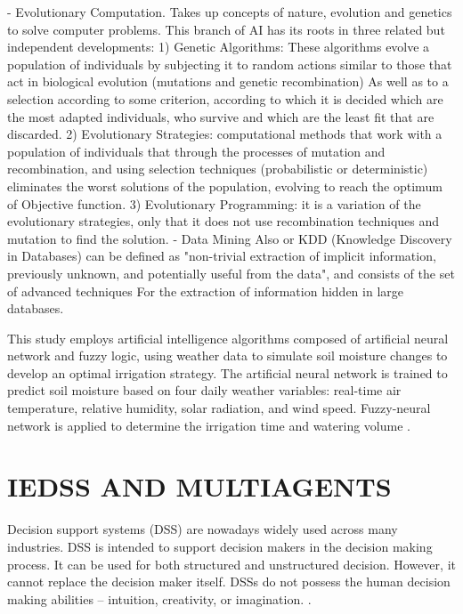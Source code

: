\documentclass[letterpaper, 10 pt, conference]{ieeeconf}  %
\begin{document}
- Evolutionary Computation. Takes up concepts of nature, evolution and genetics to solve computer problems. This branch of AI has its roots in three related but independent developments: 1) Genetic Algorithms: These algorithms evolve a population of individuals by subjecting it to random actions similar to those that act in biological evolution (mutations and genetic recombination) As well as to a selection according to some criterion, according to which it is decided which are the most adapted individuals, who survive and which are the least fit that are discarded. 2) Evolutionary Strategies: computational methods that work with a population of individuals that through the processes of mutation and recombination, and using selection techniques (probabilistic or deterministic) eliminates the worst solutions of the population, evolving to reach the optimum of Objective function. 3) Evolutionary Programming: it is a variation of the evolutionary strategies, only that it does not use recombination techniques and mutation to find the solution.
- Data Mining Also or KDD (Knowledge Discovery in Databases) can be defined as "non-trivial extraction of implicit information, previously unknown, and potentially useful from the data", and consists of the set of advanced techniques For the extraction of information hidden in large databases.

This study employs artificial intelligence algorithms composed of artificial neural network and fuzzy logic, using weather data to simulate soil moisture changes to develop an optimal irrigation strategy. The artificial neural network is trained to predict soil moisture based on four daily weather variables: real-time air temperature, relative humidity, solar radiation, and wind speed. Fuzzy-neural network is applied to determine the irrigation time and watering volume \cite{Tsang2016}.

\section{IEDSS AND MULTIAGENTS}


Decision support systems (DSS) are nowadays widely used across many industries. DSS is intended to support decision makers in the decision making process. It can be used for both structured and unstructured decision. However, it cannot replace the decision maker itself. DSSs do not possess the human decision making abilities – intuition, creativity, or imagination. \cite{KOvZIvSEK}.
\end{document}
